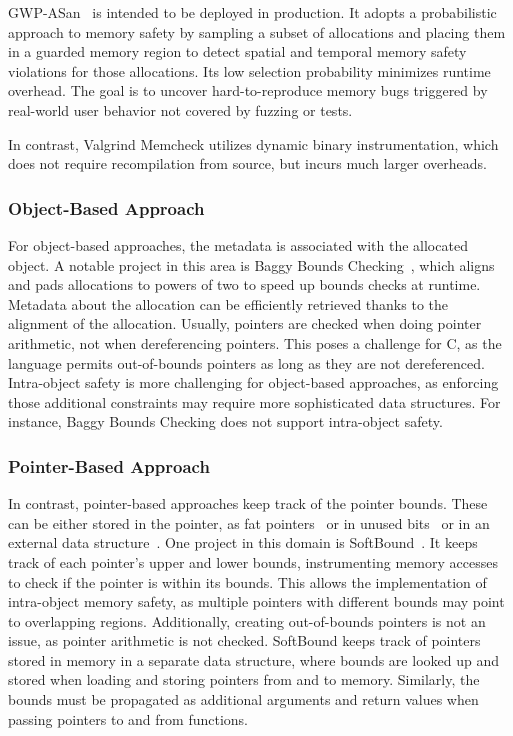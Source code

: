 GWP-ASan~\cite{serebryany2023gwp} is intended to be deployed in production.
It adopts a probabilistic approach to memory safety by sampling a subset of allocations and placing them in a guarded memory region to detect spatial and temporal memory safety violations for those allocations.
Its low selection probability minimizes runtime overhead.
The goal is to uncover hard-to-reproduce memory bugs triggered by real-world user behavior not covered by fuzzing or tests.

In contrast, Valgrind Memcheck utilizes dynamic binary instrumentation, which does not require recompilation from source, but incurs much larger overheads.

\subsubsection{Object-Based Approach}

For object-based approaches, the metadata is associated with the allocated object.
A notable project in this area is Baggy Bounds Checking~\cite{akritidis2009baggy}, which aligns and pads allocations to powers of two to speed up bounds checks at runtime.
Metadata about the allocation can be efficiently retrieved thanks to the alignment of the allocation.
Usually, pointers are checked when doing pointer arithmetic, not when dereferencing pointers.
This poses a challenge for C, as the language permits out-of-bounds pointers as long as they are not dereferenced.
Intra-object safety is more challenging for object-based approaches, as enforcing those additional constraints may require more sophisticated data structures.
For instance, Baggy Bounds Checking does not support intra-object safety.

\subsubsection{Pointer-Based Approach}

In contrast, pointer-based approaches keep track of the pointer bounds.
These can be either stored in the pointer, as fat pointers~\cite{watson_cheri_2020} or in unused bits~\cite{serebryany2018memory} or in an external data structure~\cite{nagarakatte2009softbound}.
One project in this domain is SoftBound~\cite{nagarakatte2009softbound}.
It keeps track of each pointer's upper and lower bounds, instrumenting memory accesses to check if the pointer is within its bounds.
This allows the implementation of intra-object memory safety, as multiple pointers with different bounds may point to overlapping regions.
Additionally, creating out-of-bounds pointers is not an issue, as pointer arithmetic is not checked.
SoftBound keeps track of pointers stored in memory in a separate data structure, where bounds are looked up and stored when loading and storing pointers from and to memory.
Similarly, the bounds must be propagated as additional arguments and return values when passing pointers to and from functions.

